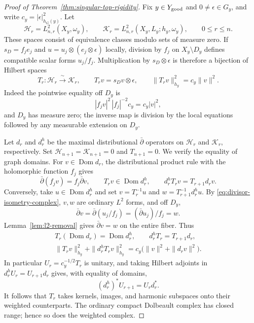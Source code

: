 \documentclass[11pt,reqno]{amsart}
\numberwithin{equation}{section}
\theoremstyle{definition}
\theoremstyle{remark}
\begin{document}
\begin{proof}[Proof of Theorem~\ref{thm:singular-top-rigidity}]
Fix $y\in Y_{\rm good}$ and $0\ne\epsilon\in G_y$, and write
$c_y=|\epsilon|_{h_G(y)}^2$.  Let
\[
 \mathcal H_r=L^2_{n,r}(X_y,\omega_y),\qquad
 \mathcal K_r=L^2_{n,r}(X_y,L_y;h_y,\omega_y),
 \qquad 0\leq r\leq n.
\]
These spaces consist of equivalence classes modulo sets of measure
zero.  If $s_D=f_j e_j$ and
$u=u_j\otimes(e_j\otimes\epsilon)$ locally, division by $f_j$ on
$X_y\setminus D_y$ defines compatible scalar forms $u_j/f_j$.
Multiplication by $s_D\otimes\epsilon$ is therefore a bijection
of Hilbert spaces
\begin{equation}\label{eq:divisor-isometry-complex}
 T_r:\mathcal H_r\xrightarrow{\ \sim\ }\mathcal K_r,
 \qquad T_rv=s_Dv\otimes\epsilon,\qquad
 \|T_rv\|_{h_y}^2=c_y\|v\|^2.
\end{equation}
Indeed the pointwise equality off $D_y$ is
\[
 |f_jv|^2\,|f_j|^{-2}c_y=c_y|v|^2,
\]
and $D_y$ has measure zero; the inverse map is division by the
local equations followed by any measurable extension on $D_y$.

Let $d_r$ and $d_r^h$ be the maximal distributional
$\bar\partial$ operators on $\mathcal H_r$ and $\mathcal K_r$,
respectively.  Set
$\mathcal H_{n+1}=\mathcal K_{n+1}=0$ and $T_{n+1}=0$.
We verify the equality of graph domains.  For $v\in\operatorname{Dom}d_r$,
the distributional product rule with the holomorphic function $f_j$
gives
\[
 \bar\partial(f_jv)=f_j\bar\partial v,\qquad
 T_rv\in\operatorname{Dom}d_r^h,\qquad
 d_r^hT_rv=T_{r+1}d_rv.
\]
Conversely, take $u\in\operatorname{Dom}d_r^h$ and set
$v=T_r^{-1}u$ and $w=T_{r+1}^{-1}d_r^hu$.  By
\eqref{eq:divisor-isometry-complex}, $v,w$ are ordinary $L^2$ forms,
and off $D_y$,
\[
 \bar\partial v=\bar\partial(u_j/f_j)
               =(\bar\partial u_j)/f_j=w.
\]
Lemma~\ref{lem:l2-removal} gives $\bar\partial v=w$ on the entire
fiber.  Thus
\begin{equation}\label{eq:top-weighted-domain-identities}
 \begin{gathered}
 T_r(\operatorname{Dom}d_r)=\operatorname{Dom}d_r^h,
 \qquad d_r^hT_r=T_{r+1}d_r,\\
 \|T_rv\|_{h_y}^2+\|d_r^hT_rv\|_{h_y}^2
       =c_y\bigl(\|v\|^2+\|d_rv\|^2\bigr).
 \end{gathered}
\end{equation}
In particular $U_r=c_y^{-1/2}T_r$ is unitary, and taking Hilbert
adjoints in $d_r^hU_r=U_{r+1}d_r$ gives, with equality of domains,
\[
 (d_r^h)^*U_{r+1}=U_rd_r^*.
\]
It follows that $T_r$ takes kernels, images, and harmonic subspaces
onto their weighted counterparts.  The ordinary compact Dolbeault
complex has closed range; hence so does the weighted complex.


\end{proof}
\end{document}
